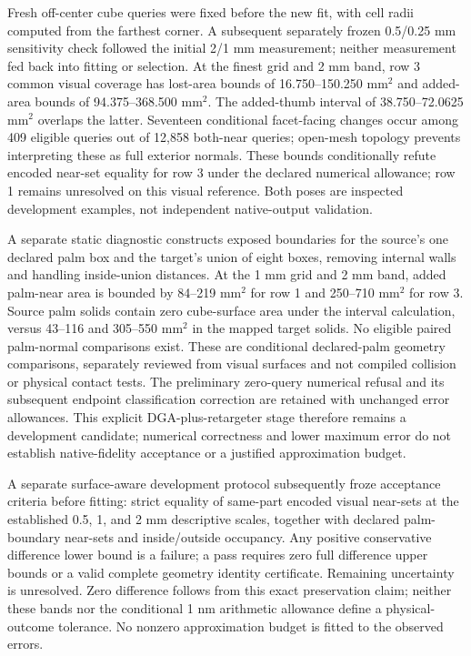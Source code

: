 \documentclass[10pt,letterpaper]{article}
\begin{document}
Fresh off-center cube queries were fixed before the new fit, with cell radii
computed from the farthest corner. A subsequent separately frozen 0.5/0.25 mm
sensitivity check followed the initial 2/1 mm measurement; neither measurement
fed back into fitting or selection. At the finest grid and 2 mm band, row 3
common visual coverage has lost-area bounds of 16.750--150.250 mm$^2$ and
added-area bounds of 94.375--368.500 mm$^2$. The added-thumb interval of
38.750--72.0625 mm$^2$ overlaps the latter. Seventeen conditional facet-facing
changes occur among 409 eligible queries out of 12,858 both-near queries;
open-mesh topology prevents interpreting these as full exterior normals.
These bounds conditionally refute encoded near-set equality for row 3 under
the declared numerical allowance; row 1 remains unresolved on this visual
reference. Both poses are inspected development examples, not independent
native-output validation.

A separate static diagnostic constructs exposed boundaries for the source's
one declared palm box and the target's union of eight boxes, removing internal
walls and handling inside-union distances. At the 1 mm grid and 2 mm band,
added palm-near area is bounded by 84--219 mm$^2$ for row 1 and
250--710 mm$^2$ for row 3. Source palm solids contain zero cube-surface area
under the interval calculation, versus 43--116 and 305--550 mm$^2$ in the mapped
target solids. No eligible paired palm-normal comparisons exist. These are
conditional declared-palm geometry comparisons, separately reviewed from
visual surfaces and not compiled collision or physical contact tests.
The preliminary zero-query numerical refusal and its subsequent endpoint
classification correction are retained with unchanged error allowances.
This explicit DGA-plus-retargeter stage therefore remains a development
candidate; numerical correctness and lower maximum error do not establish
native-fidelity acceptance or a justified approximation budget.

A separate surface-aware development protocol subsequently froze acceptance
criteria before fitting: strict equality of same-part encoded visual near-sets
at the established 0.5, 1, and 2 mm descriptive scales, together with declared
palm-boundary near-sets and inside/outside occupancy. Any positive conservative
difference lower bound is a failure; a pass requires zero full difference upper
bounds or a valid complete geometry identity certificate. Remaining uncertainty
is unresolved. Zero difference follows from this exact preservation claim;
neither these bands nor the conditional 1 nm arithmetic allowance define a
physical-outcome tolerance. No nonzero approximation budget is fitted to the
observed errors.
\end{document}
